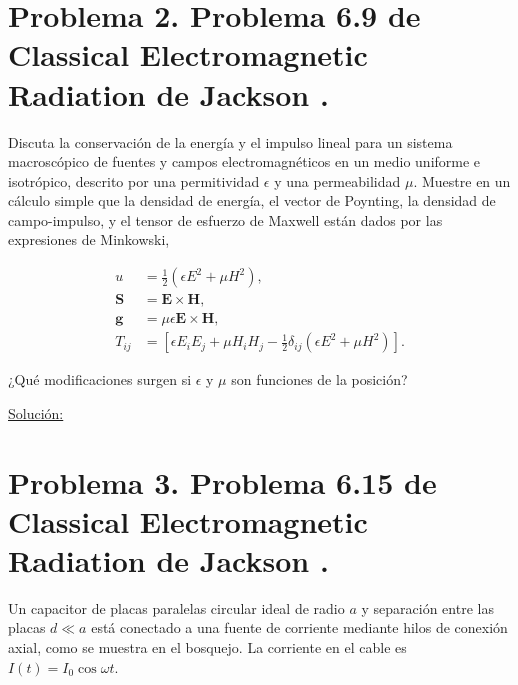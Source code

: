 \documentclass[a4paper,11pt]{article}
\numberwithin{equation}{section}
\begin{document}
\newpage

\section{Problema 2. Problema 6.9 de Classical Electromagnetic Radiation
de Jackson \cite{jackson}.}

Discuta la conservación de la energía y el impulso lineal para un sistema macroscópico 
de fuentes y campos electromagnéticos en un medio uniforme e isotrópico, descrito 
por una permitividad $\epsilon$ y una permeabilidad $\mu$. Muestre en un cálculo 
simple que la densidad de energía, el vector de Poynting, la densidad de campo-impulso, 
y el tensor de esfuerzo de Maxwell están dados por las expresiones de Minkowski,

\begin{align*}
u &= \frac{1}{2}(\epsilon E^2 + \mu H^2), \\
\mathbf{S} &= \mathbf{E} \times \mathbf{H}, \\
\mathbf{g} &= \mu\epsilon \mathbf{E} \times \mathbf{H}, \\
T_{ij} &= [\epsilon E_iE_j + \mu H_iH_j - \frac{1}{2}\delta_{ij}(\epsilon E^2 + \mu H^2)].
\end{align*}

¿Qué modificaciones surgen si $\epsilon$ y $\mu$ son funciones de la posición?

\vspace{.3cm}

\underline{Solución:} \vspace{.3cm}

\newpage

\section{Problema 3. Problema 6.15 de Classical Electromagnetic Radiation
de Jackson \cite{jackson}.}

Un capacitor de placas paralelas circular ideal de radio $a$ y separación entre 
las placas $d \ll a$ está conectado a una fuente de corriente mediante hilos de 
conexión axial, como se muestra en el bosquejo. La corriente en el cable es 
$I(t) = I_0\cos{\omega t}$.
\end{document}
